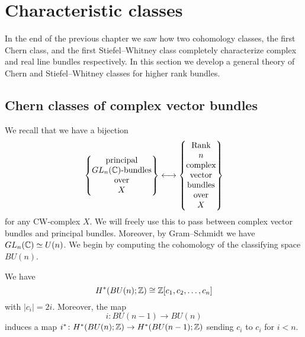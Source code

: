 \documentclass[ma3408.tex]{subfiles}
\begin{document}
\chapter{Characteristic classes}
In the end of the previous chapter we saw how two cohomology classes, the first Chern class, and the first Stiefel--Whitney class completely characterize complex and real line bundles respectively. In this section we develop a general theory of Chern and Stiefel--Whitney classes for higher rank bundles. 
\section{Chern classes of complex vector bundles}
\begin{Rem}
We recall that we have a bijection
\[
 \renewcommand\stacktype{L}
 \strutlongstacks{T}
\left\{\vcenter{\hbox{$\Longstack[c]{principal $GL_n(\bbC)$-bundles over $X$}$}}\right\} 
\longleftrightarrow 
\left\{\vcenter{\hbox{$\Longstack[c]{Rank $n$ complex vector bundles over $X$}$}}\right\}
\]
for any CW-complex $X$. We will freely use this to pass between complex vector bundles and principal bundles. Moreover, by Gram--Schmidt we have $GL_n(\mathbb{C}) \simeq U(n)$. We begin by computing the cohomology of the classifying space $BU(n)$. 
\end{Rem}
\begin{Prop}\label{prop:cohomology-of-bun}
We have
\[
H^*(BU(n);\mathbb{Z}) \cong \mathbb{Z}[c_1,c_2,\ldots,c_n]
\]
with $|c_i| = 2i$. Moreover, the map
\[
i \colon BU(n-1) \to BU(n)
\]
induces a map $i^* \colon H^*(BU(n);\mathbb{Z}) \to H^*(BU(n-1);\mathbb{Z})$ sending $c_i$ to $c_i$ for $i<n$.  
\end{Prop}
\end{document}
